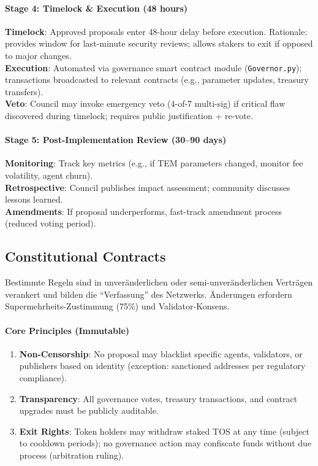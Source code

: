 \documentclass[11pt]{article}
\begin{document}
\paragraph{Stage 4: Timelock \& Execution (48 hours)}
\textbf{Timelock}: Approved proposals enter 48-hour delay before execution. Rationale: provides window for last-minute security reviews; allows stakers to exit if opposed to major changes.\\
\textbf{Execution}: Automated via governance smart contract module (\texttt{Governor.py}); transactions broadcasted to relevant contracts (e.g., parameter updates, treasury transfers).\\
\textbf{Veto}: Council may invoke emergency veto (4-of-7 multi-sig) if critical flaw discovered during timelock; requires public justification + re-vote.

\paragraph{Stage 5: Post-Implementation Review (30--90 days)}
\textbf{Monitoring}: Track key metrics (e.g., if TEM parameters changed, monitor fee volatility, agent churn).\\
\textbf{Retrospective}: Council publishes impact assessment; community discusses lessons learned.\\
\textbf{Amendments}: If proposal underperforms, fast-track amendment process (reduced voting period).

\subsection{Constitutional Contracts}

Bestimmte Regeln sind in unveränderlichen oder semi-unveränderlichen Verträgen verankert und bilden die ``Verfassung'' des Netzwerks. Änderungen erfordern Supermehrheits-Zustimmung (75\%) und Validator-Konsens.

\paragraph{Core Principles (Immutable)}
\begin{enumerate}[noitemsep]
  \item \textbf{Non-Censorship}: No proposal may blacklist specific agents, validators, or publishers based on identity (exception: sanctioned addresses per regulatory compliance).
  \item \textbf{Transparency}: All governance votes, treasury transactions, and contract upgrades must be publicly auditable.
  \item \textbf{Exit Rights}: Token holders may withdraw staked TOS at any time (subject to cooldown periods); no governance action may confiscate funds without due process (arbitration ruling).
\end{enumerate}
\end{document}
